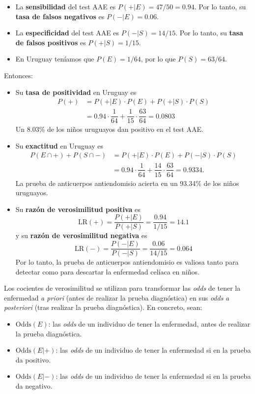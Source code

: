 \documentclass[
]{book}
\theoremstyle{definition}
\theoremstyle{definition}
\theoremstyle{definition}
\theoremstyle{definition}
\theoremstyle{remark}
\begin{document}
\begin{itemize}
\item
  La \textbf{sensibilidad} del test AAE es \(P(+|E)=47/50=0.94\). Por lo tanto, su \textbf{tasa de falsos negativos} es \(P(-|E)=0.06\).
\item
  La \textbf{especificidad} del test AAE es \(P(-|S)= 14/15\). Por lo tanto, su \textbf{tasa de falsos positivos} es \(P(+|S)=1/15\).
\item
  En Uruguay teníamos que \(P(E)=1/64\), por lo que \(P(S)=63/64\).
\end{itemize}

Entonces:

\begin{itemize}
\item
  Su \textbf{tasa de positividad} en Uruguay es
  \[
  \begin{array}{rl}
  P(+)\!\!\!\!\! & =P(+|E)\cdot P(E)+P(+|S)\cdot P(S)\\
  & =0.94\cdot \dfrac{1}{64}+\dfrac{1}{15}\cdot \dfrac{63}{64}=0.0803
  \end{array}
  \]
  Un 8.03\% de los niños uruguayos dan positivo en el test AAE.
\item
  Su \textbf{exactitud} en Uruguay es\\
  \[
  \begin{array}{rl}
  P(E\cap +)+P(S\cap -)\!\!\!\!\! & =P(+|E)\cdot P(E)+P(-|S)\cdot P(S)\\
  & =0.94\cdot \dfrac{1}{64}+\dfrac{14}{15}\cdot \dfrac{63}{64}=0.9334.
  \end{array}
  \]
  La prueba de anticuerpos antiendomisio acierta en un 93.34\% de los niños uruguayos.
\item
  Su \textbf{razón de verosimilitud positiva} es
  \[
  \text{LR}(+)=\dfrac{P(+|E)}{P(+|S)}=\frac{0.94}{1/15}=14.1
  \]
  y su \textbf{razón de verosimilitud negativa} es
  \[
  \text{LR}(-)=\dfrac{P(-|E)}{P(-|S)}=\frac{0.06}{14/15}=0.064
  \]
  Por lo tanto, la prueba de anticuerpos antiendomisio es valiosa tanto para detectar como para descartar la enfermedad celíaca en niños.
\end{itemize}

Los cocientes de verosimilitud se utilizan para transformar las \emph{odds} de tener la enfermedad \emph{a priori} (antes de realizar la prueba diagnóstica) en sus \emph{odds} \emph{a posteriori} (tras realizar la prueba diagnóstica). En concreto, sean:

\begin{itemize}
\item
  \(\text{Odds}(E)\): las \emph{odds} de un individuo de tener la enfermedad, antes de realizar la prueba diagnóstica.
\item
  \(\text{Odds}(E|+)\): las \emph{odds} de un individuo de tener la enfermedad si en la prueba da positivo.
\item
  \(\text{Odds}(E|-)\): las \emph{odds} de un individuo de tener la enfermedad si en la prueba da negativo.
\end{itemize}
\end{document}
